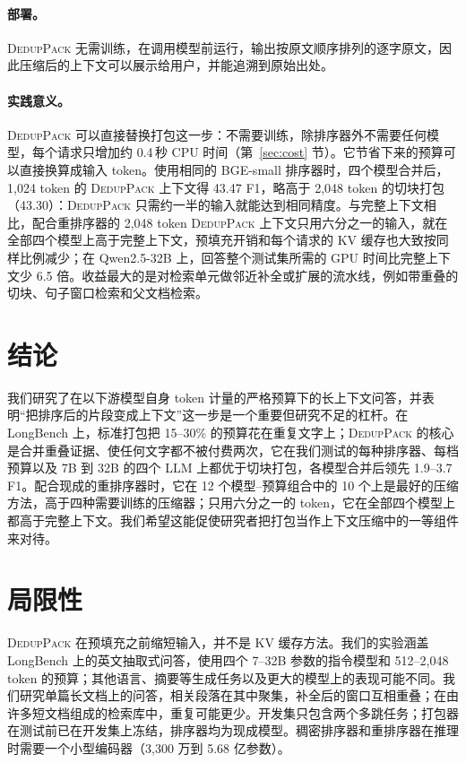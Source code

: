 \documentclass[11pt]{article}
\newcommand{\spk}{\textsc{DedupPack}}
\begin{document}
\paragraph{部署。}\spk{} 无需训练，在调用模型前运行，输出按原文顺序排列的逐字原文，因此压缩后的上下文可以展示给用户，并能追溯到原始出处。

\paragraph{实践意义。}\spk{} 可以直接替换打包这一步：不需要训练，除排序器外不需要任何模型，每个请求只增加约 0.4\,秒 CPU 时间（第~\ref{sec:cost} 节）。它节省下来的预算可以直接换算成输入 token。使用相同的 BGE-small 排序器时，四个模型合并后，1,024 token 的 \spk{} 上下文得 43.47 F1，略高于 2,048 token 的切块打包（43.30）：\spk{} 只需约一半的输入就能达到相同精度。与完整上下文相比，配合重排序器的 2,048 token \spk{} 上下文只用六分之一的输入，就在全部四个模型上高于完整上下文，预填充开销和每个请求的 KV 缓存也大致按同样比例减少；在 Qwen2.5-32B 上，回答整个测试集所需的 GPU 时间比完整上下文少 6.5 倍。收益最大的是对检索单元做邻近补全或扩展的流水线，例如带重叠的切块、句子窗口检索和父文档检索。

\section{结论}
我们研究了在以下游模型自身 token 计量的严格预算下的长上下文问答，并表明“把排序后的片段变成上下文”这一步是一个重要但研究不足的杠杆。在 LongBench 上，标准打包把 15--30\% 的预算花在重复文字上；\spk{} 的核心是合并重叠证据、使任何文字都不被付费两次，它在我们测试的每种排序器、每档预算以及 7B 到 32B 的四个 LLM 上都优于切块打包，各模型合并后领先 1.9--3.7 F1。配合现成的重排序器时，它在 12 个模型--预算组合中的 10 个上是最好的压缩方法，高于四种需要训练的压缩器；只用六分之一的 token，它在全部四个模型上都高于完整上下文。我们希望这能促使研究者把打包当作上下文压缩中的一等组件来对待。

\section*{局限性}
\spk{} 在预填充之前缩短输入，并不是 KV 缓存方法。我们的实验涵盖 LongBench 上的英文抽取式问答，使用四个 7--32B 参数的指令模型和 512--2,048 token 的预算；其他语言、摘要等生成任务以及更大的模型上的表现可能不同。我们研究单篇长文档上的问答，相关段落在其中聚集，补全后的窗口互相重叠；在由许多短文档组成的检索库中，重复可能更少。开发集只包含两个多跳任务；打包器在测试前已在开发集上冻结，排序器均为现成模型。稠密排序器和重排序器在推理时需要一个小型编码器（3,300 万到 5.68 亿参数）。
\end{document}
